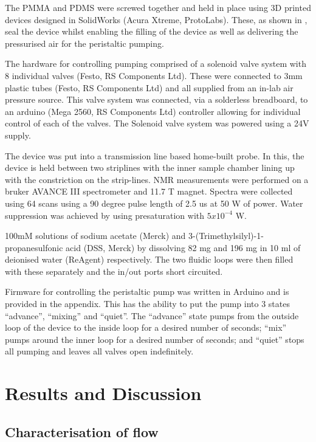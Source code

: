 The PMMA and PDMS were screwed together and held in place using 3D printed devices
designed in SolidWorks (Acura Xtreme, ProtoLabs). These, as shown in , seal the
device whilst enabling the filling of the device as well as delivering the pressurised
air for the peristaltic pumping.

The hardware for controlling pumping comprised of a solenoid valve system with 8
individual valves (Festo, RS Components Ltd). These were connected to 3mm plastic tubes
(Festo, RS Components Ltd) and all supplied from an in-lab air pressure source. This valve system was connected,
via a solderless breadboard, to an arduino (Mega 2560, RS Components Ltd) controller allowing for
individual control of each of the valves. The Solenoid valve system was powered using
a 24V supply.

The device was put into a transmission line based home-built probe. In this, the
device is held between two striplines with the inner sample chamber lining up with the
constriction on the strip-lines. NMR measurements were performed on a bruker AVANCE
III spectrometer and 11.7 T magnet. Spectra were collected using 64 scans using a 90
degree pulse length of 2.5 us at 50 W of power. Water suppression was achieved by
using presaturation with $5x10^{-4}$ W.

100mM solutions of sodium acetate (Merck) and 3-(Trimethylsilyl)-1-propanesulfonic
acid (DSS, Merck) by dissolving 82 mg and 196 mg in 10 ml of deionised water
(ReAgent)
respectively. The two fluidic loops were then filled with these separately and the
in/out ports short circuited.

Firmware for controlling the peristaltic pump was written in Arduino and is provided in the appendix.
This has the ability to put the pump into 3 states
“advance”, “mixing” and “quiet”. The “advance” state pumps from the outside loop of
the device to the inside loop for a desired number of seconds; “mix” pumps around the
inner loop for a desired number of seconds; and “quiet” stops all pumping and leaves
all valves open indefinitely.


\section{Results and Discussion}

\subsection{Characterisation of flow}


